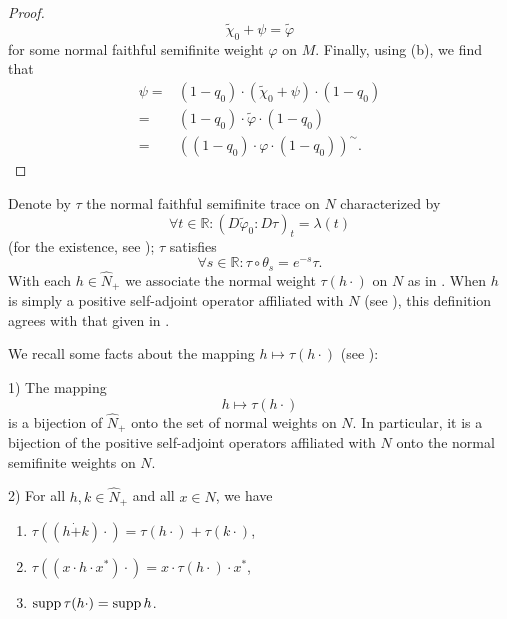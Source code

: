 \begin{proof}
    \[
        \widetilde{\chi}_0+\psi=\tilde{\varphi}
    \]
    for some normal faithful semifinite weight $\varphi$ on $M$. Finally, using (b), we find that
    \[
        \begin{split}
            \psi=&(1-q_0)\cdot (\widetilde{\chi}_0+\psi)\cdot (1-q_0)\\
            =&(1-q_0)\cdot \tilde{\varphi}\cdot (1-q_0)\\
            =&((1-q_0)\cdot \varphi\cdot (1-q_0))^\sim.
        \end{split}
    \]
\end{proof}

Denote by $\tau$ the normal faithful semifinite trace on $N$ characterized by
\begin{equation}\label{Chap2: eqn: 14}
    \forall t\in \mathbb{R}:(D\tilde{\varphi}_0:D\tau)_t=\lambda(t)
\end{equation}
(for the existence, see \cite[Lemma 5.2]{8}); $\tau$ satisfies
\begin{equation}\label{Chap2: eqn: 15}
    \forall s\in \mathbb{R}:\tau\circ \theta_s=e^{-s}\tau.
\end{equation}
With each $h\in \hat{N}_+$ we associate the normal weight $\tau(h\cdot)$ on $N$ as in \cite[remarks preceding Proposition 1.11]{8}. When $h$ is simply a positive self-adjoint operator affiliated with $N$ (see \cite[Example 1.2]{7}), this definition agrees with that given in \cite[Section 4]{14}.\par
We recall some facts about the mapping $h\mapsto \tau(h\cdot)$ (see \cite[Theorem 1.12 (and its proof) and Preposition 1.11, (4)]{7}):
\begin{lemma}\label{Chap2: lemma: 2}
    1) The mapping
    \[
        h\mapsto \tau(h\cdot)
    \]
    is a bijection of $\hat{N}_+$ onto the set of normal weights on $N$. In particular, it is a bijection of the positive self-adjoint operators affiliated with $N$ onto the normal semifinite weights on $N$.\par
    2) For all $h,k\in \hat{N}_+$ and all $x\in N$, we have
    \begin{enumerate}
        \item $\tau((h\dot{+}k)\cdot)=\tau(h\cdot)+\tau(k\cdot)$,
        \item $\tau((x\cdot h\cdot x^*)\cdot)=x\cdot \tau(h\cdot)\cdot x^*$,
        \item $\operatorname{supp} \tau(h\cdot)=\operatorname{supp} h$.
    \end{enumerate}
\end{lemma}
